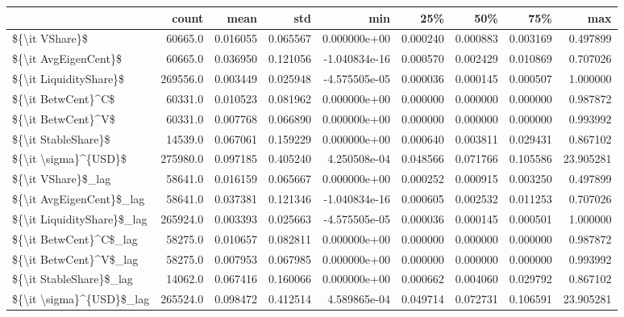 \begin{tabular}{lrrrrrrrr}
\toprule
{} &     count &      mean &       std &           min &       25\% &       50\% &       75\% &        max \\
\midrule
\$\{\textbackslash it VShare\}\$             &   60665.0 &  0.016055 &  0.065567 &  0.000000e+00 &  0.000240 &  0.000883 &  0.003169 &   0.497899 \\
\$\{\textbackslash it AvgEigenCent\}\$       &   60665.0 &  0.036950 &  0.121056 & -1.040834e-16 &  0.000570 &  0.002429 &  0.010869 &   0.707026 \\
\$\{\textbackslash it LiquidityShare\}\$     &  269556.0 &  0.003449 &  0.025948 & -4.575505e-05 &  0.000036 &  0.000145 &  0.000507 &   1.000000 \\
\$\{\textbackslash it BetwCent\}\textasciicircum C\$         &   60331.0 &  0.010523 &  0.081962 &  0.000000e+00 &  0.000000 &  0.000000 &  0.000000 &   0.987872 \\
\$\{\textbackslash it BetwCent\}\textasciicircum V\$         &   60331.0 &  0.007768 &  0.066890 &  0.000000e+00 &  0.000000 &  0.000000 &  0.000000 &   0.993992 \\
\$\{\textbackslash it StableShare\}\$        &   14539.0 &  0.067061 &  0.159229 &  0.000000e+00 &  0.000640 &  0.003811 &  0.029431 &   0.867102 \\
\$\{\textbackslash it \textbackslash sigma\}\textasciicircum \{USD\}\$       &  275980.0 &  0.097185 &  0.405240 &  4.250508e-04 &  0.048566 &  0.071766 &  0.105586 &  23.905281 \\
\$\{\textbackslash it VShare\}\$\_lag         &   58641.0 &  0.016159 &  0.065667 &  0.000000e+00 &  0.000252 &  0.000915 &  0.003250 &   0.497899 \\
\$\{\textbackslash it AvgEigenCent\}\$\_lag   &   58641.0 &  0.037381 &  0.121346 & -1.040834e-16 &  0.000605 &  0.002532 &  0.011253 &   0.707026 \\
\$\{\textbackslash it LiquidityShare\}\$\_lag &  265924.0 &  0.003393 &  0.025663 & -4.575505e-05 &  0.000036 &  0.000145 &  0.000501 &   1.000000 \\
\$\{\textbackslash it BetwCent\}\textasciicircum C\$\_lag     &   58275.0 &  0.010657 &  0.082811 &  0.000000e+00 &  0.000000 &  0.000000 &  0.000000 &   0.987872 \\
\$\{\textbackslash it BetwCent\}\textasciicircum V\$\_lag     &   58275.0 &  0.007953 &  0.067985 &  0.000000e+00 &  0.000000 &  0.000000 &  0.000000 &   0.993992 \\
\$\{\textbackslash it StableShare\}\$\_lag    &   14062.0 &  0.067416 &  0.160066 &  0.000000e+00 &  0.000662 &  0.004060 &  0.029792 &   0.867102 \\
\$\{\textbackslash it \textbackslash sigma\}\textasciicircum \{USD\}\$\_lag   &  265524.0 &  0.098472 &  0.412514 &  4.589865e-04 &  0.049714 &  0.072731 &  0.106591 &  23.905281 \\
\bottomrule
\end{tabular}
